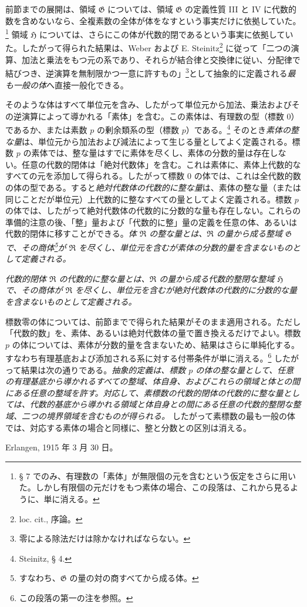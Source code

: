 \documentclass[11pt]{article}
\begin{document}
前節までの展開は、領域 $\mathfrak G$ については、領域 $\mathfrak G$ の定義性質 III と IV に代数的数を含めないなら、全複素数の全体が体をなすという事実だけに依拠していた。\footnote{§ 7 でのみ、有理数の「素体」が無限個の元を含むという仮定をさらに用いた。しかし有限個の元だけをもつ素体の場合、この段落は、これから見るように、単に消える。} 領域 $\mathfrak H$ については、さらにこの体が代数的閉であるという事実に依拠していた。したがって得られた結果は、Weber および E. Steinitz\footnote{loc. cit., 序論。} に従って「二つの演算、加法と乗法をもつ元の系であり、それらが結合律と交換律に従い、分配律で結びつき、逆演算を無制限かつ一意に許すもの」\footnote{零による除法だけは除かなければならない。}として抽象的に定義される\emph{最も一般の体}へ直接一般化できる。

そのような体はすべて単位元を含み、したがって単位元から加法、乗法およびその逆演算によって導かれる「素体」を含む。この素体は、有理数の型（標数 $0$）であるか、または素数 $p$ の剰余類系の型（標数 $p$）である。\footnote{Steinitz, § 4.} そのとき\emph{素体の整な量}は、単位元から加法および減法によって生じる量としてよく定義される。標数 $p$ の素体では、整な量はすでに素体を尽くし、素体の分数的量は存在しない。任意の代数的閉体は「絶対代数体」を含む。これは素体に、素体上代数的なすべての元を添加して得られる。したがって標数 $0$ の体では、これは全代数的数の体の型である。すると\emph{絶対代数体の代数的に整な量}は、素体の整な量（または同じことだが単位元）上代数的に整なすべての量としてよく定義される。標数 $p$ の体では、したがって絶対代数体の代数的に分数的な量も存在しない。これらの準備的注意の後、「整」量および「代数的に整」量の定義を任意の体、あるいは代数的閉体に移すことができる。\emph{体 $\mathfrak R$ の整な量とは、$\mathfrak R$ の量から成る整域 $\mathfrak G$ で、その商体\footnote{すなわち、$\mathfrak G$ の量の対の商すべてから成る体。}が $\mathfrak R$ を尽くし、単位元を含むが素体の分数的量を含まないものとして定義される。}

\emph{代数的閉体 $\mathfrak R$ の代数的に整な量とは、$\mathfrak R$ の量から成る代数的整閉な整域 $\mathfrak H$ で、その商体が $\mathfrak R$ を尽くし、単位元を含むが絶対代数体の代数的に分数的な量を含まないものとして定義される。}

標数零の体については、前節までで得られた結果がそのまま適用される。ただし「代数的数」を、素体、あるいは絶対代数体の量で置き換えるだけでよい。標数 $p$ の体については、素体が分数的量を含まないため、結果はさらに単純化する。すなわち有理基底および添加される系に対する付帯条件が単に消える。\footnote{この段落の第一の注を参照。} したがって結果は次の通りである。\emph{抽象的定義は、標数 $p$ の体の整な量として、任意の有理基底から導かれるすべての整域、体自身、およびこれらの領域と体との間にある任意の整域を許す。対応して、素標数の代数的閉体の代数的に整な量としては、代数的基底から導かれる領域と体自身との間にある任意の代数的整閉な整域、二つの境界領域を含むものが得られる。} したがって素標数の最も一般の体では、対応する素体の場合と同様に、整と分数との区別は消える。

\medskip
\noindent Erlangen, 1915 年 3 月 30 日。
\end{document}
